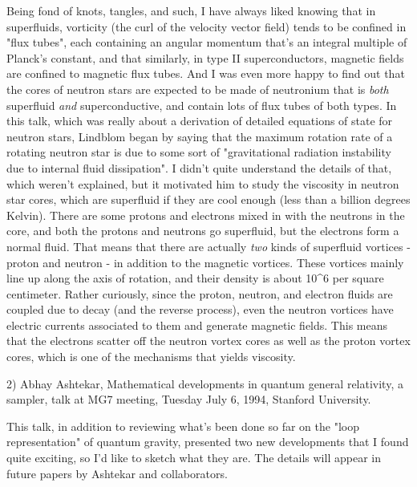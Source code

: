 Being fond of knots, tangles, and such, I have always liked
knowing that in superfluids, vorticity (the curl of the  velocity
vector field) tends to be confined in "flux tubes", each
containing an angular momentum that's an integral multiple of 
Planck's constant, and that similarly, in type II
superconductors, magnetic fields are confined to magnetic flux
tubes.  And I was even more happy to find out that the cores of 
neutron stars are expected to be made of neutronium that is
\emph{both} superfluid \emph{and} superconductive, and contain lots of flux
tubes of both types.  In this talk, which was really about a
derivation of detailed equations of state for neutron stars,
Lindblom began by saying that the maximum rotation rate of a
rotating neutron star is due to some sort of "gravitational
radiation instability due to internal fluid dissipation".  I
didn't quite understand the details of that, which weren't
explained, but it motivated him to study the viscosity in
neutron star cores, which are superfluid if they are cool enough
(less than a billion degrees Kelvin).  There are some protons and
electrons mixed in with the neutrons in the core, and both the
protons and neutrons go superfluid, but the electrons form a
normal fluid.  That means that there are actually \emph{two} kinds of
superfluid vortices - proton and neutron - in addition to the
magnetic vortices.   These vortices mainly line up along the axis
of rotation, and their density is about 10^6 per square
centimeter.  Rather curiously, since the proton, neutron, and
electron fluids are coupled due to \beta  decay (and the reverse
process), even the neutron vortices have electric currents
associated to them and generate magnetic fields.  This means that
the electrons scatter off the neutron vortex cores as well as the
proton vortex cores, which is one of the mechanisms that yields
viscosity.

2) Abhay Ashtekar, Mathematical developments in quantum general
relativity, a sampler, talk at MG7 meeting, Tuesday July 6, 1994,
Stanford University.

This talk, in addition to reviewing what's been done so far on 
the "loop representation" of quantum gravity, presented two new
developments that I found quite exciting, so I'd like to sketch
what they are.  The details will appear in future papers by
Ashtekar and collaborators.   

